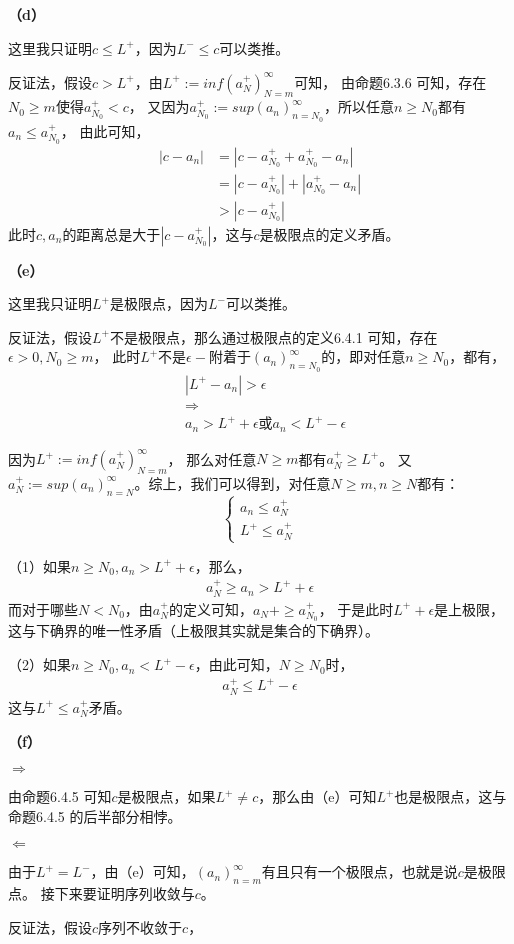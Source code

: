 \documentclass{article}
\theoremstyle{mystyle}
\begin{document}
\textbf{（d）}

这里我只证明$c \leq L^+$，因为$L^- \leq c$可以类推。

反证法，假设$c > L^+$，由$L^+ := inf(a_N^+)_{N=m}^\infty$可知，
由命题6.3.6 可知，存在$N_0 \geq m$使得$a_{N_0}^+ < c$，
又因为$a_{N_0}^+ := sup(a_n)_{n=N_0}^\infty$，所以任意$n \geq N_0$都有$a_n \leq a_{N_0}^+$，
由此可知，
\begin{align*}
  |c - a_n| & = |c - a_{N_0}^+ + a_{N_0}^+ - a_n|   \\
            & = |c - a_{N_0}^+| + |a_{N_0}^+ - a_n| \\
            & > |c - a_{N_0}^+|
\end{align*}
此时$c,a_n$的距离总是大于$|c - a_{N_0}^+|$，这与$c$是极限点的定义矛盾。

\textbf{（e）}

这里我只证明$L^+$是极限点，因为$L^-$可以类推。

反证法，假设$L^+$不是极限点，那么通过极限点的定义6.4.1 可知，存在$\epsilon > 0, N_0 \geq m$，
此时$L^+$不是$\epsilon -$附着于$(a_n)_{n=N_0}^\infty$的，即对任意$n \geq N_0$，都有，
\begin{align*}
   & |L^+ - a_n| > \epsilon                             \\
   & \Rightarrow                                        \\
   & a_n > L^+ + \epsilon \text{或} a_n < L^+ - \epsilon
\end{align*}

因为$L^+ := inf(a_N^+)_{N=m}^\infty$，
那么对任意$N \geq m$都有$a_N^+ \geq L^+$。
又$a_N^+ := sup(a_n)_{n=N}^\infty$。综上，我们可以得到，对任意$N \geq m, n \geq N$都有：
\begin{equation}
  \begin{cases*}
    a_n \leq a_N^+ \\
    L^+ \leq a_N^+
  \end{cases*}
\end{equation}

（1）如果$n \geq N_0, a_n > L^+ + \epsilon$，那么，
\begin{align*}
  a_N^+ \geq a_n > L^+ + \epsilon
\end{align*}
而对于哪些$N < N_0$，由$a_N^+$的定义可知，$a_N+ \geq a_{N_0}^+$，
于是此时$L^+ + \epsilon$是上极限，这与下确界的唯一性矛盾（上极限其实就是集合的下确界）。

（2）如果$n \geq N_0, a_n < L^+ - \epsilon$，由此可知，$N \geq N_0$时，
\begin{align*}
  a_N^+ \leq L^+ - \epsilon
\end{align*}
这与$L^+ \leq a_N^+$矛盾。

\textbf{（f）}

\textbf{$\Rightarrow$}

由命题6.4.5 可知$c$是极限点，如果$L^+ \neq c$，那么由（e）可知$L^+$也是极限点，这与命题6.4.5
的后半部分相悖。

\textbf{$\Leftarrow$}

由于$L^+ = L^-$，由（e）可知，$(a_n)_{n=m}^\infty$有且只有一个极限点，也就是说$c$是极限点。
接下来要证明序列收敛与$c$。

反证法，假设$c$序列不收敛于$c$，
\end{document}
